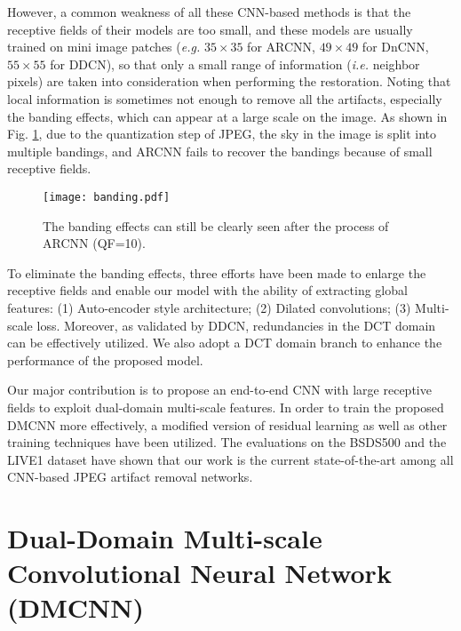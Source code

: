 \documentclass{article}
\begin{document}
However, a common weakness of all these CNN-based methods is that
the receptive fields of their models are too small, and these models are
usually trained on mini image patches (\textit{e.g.} $35 \times 35$ for ARCNN,
$49 \times 49$ for DnCNN, $55 \times 55$ for DDCN), so that only a
small range of information (\textit{i.e.} neighbor pixels) are
taken into consideration when performing the restoration. Noting that
local information is sometimes not enough to remove all the artifacts,
especially the banding effects, which can appear at a large scale on the image.
As shown in Fig. \ref{fig:f1}, due to the quantization step of JPEG,
the sky in the image is split into multiple bandings, and ARCNN fails to
recover the bandings because of small receptive fields.

\begin{figure}[htb]
  \begin{minipage}[b]{1.0\linewidth}
    \centering
    \centerline{\texttt{[image: banding.pdf]}}
\caption{The banding effects can still be clearly seen
    after the process of ARCNN (QF=10).}\medskip
    \label{fig:f1}
    \vspace{-0.5cm}
  \end{minipage}
\end{figure}

To eliminate the banding effects, three efforts have been made to
enlarge the receptive fields and enable our model with
the ability of extracting global features:
(1) Auto-encoder style architecture; (2) Dilated convolutions;
(3) Multi-scale loss. Moreover, as validated by DDCN, redundancies in
the DCT domain can be effectively utilized. We also adopt a DCT domain branch
to enhance the performance of the proposed model.

Our major contribution is to propose an end-to-end CNN with
large receptive fields to exploit dual-domain multi-scale features. In order to
train the proposed DMCNN more effectively, a modified version of
residual learning as well as other training techniques have been utilized.
The evaluations on the BSDS500 and the LIVE1 dataset have shown that our work
is the current state-of-the-art among all CNN-based JPEG artifact removal networks.
\vspace{-0.2cm}

\section{Dual-Domain Multi-scale
Convolutional Neural Network (DMCNN)}
\label{sec:model}
\vspace{-0.2cm}
   
\end{document}
